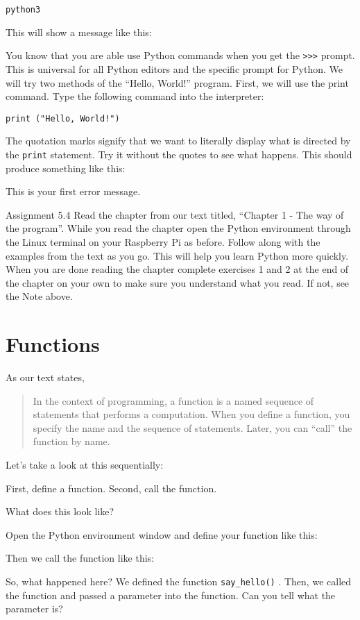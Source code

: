 \documentclass[
]{book}
\begin{document}
\texttt{python3}

This will show a message like this:

You know that you are able use Python commands when you get the \texttt{\textgreater{}\textgreater{}\textgreater{}} prompt. This is universal for all Python editors and the specific prompt for Python. We will try two methods of the ``Hello, World!'' program. First, we will use the print command. Type the following command into the interpreter:

\texttt{print\ ("Hello,\ World!")}

The quotation marks signify that we want to literally display what is directed by the \texttt{print} statement. Try it without the quotes to see what happens. This should produce something like this:

This is your first error message.

Assignment 5.4
Read the chapter from our text titled, ``Chapter 1 - The way of the program''. While you read the chapter open the Python environment through the Linux terminal on your Raspberry Pi as before. Follow along with the examples from the text as you go. This will help you learn Python more quickly. When you are done reading the chapter complete exercises 1 and 2 at the end of the chapter on your own to make sure you understand what you read. If not, see the Note above.

\hypertarget{functions}{%
\section{Functions}\label{functions}}

As our text states,

\begin{quote}
In the context of programming, a function is a named sequence of statements that performs a computation. When you define a function, you specify the name and the sequence of statements. Later, you can ``call'' the function by name.
\end{quote}

Let's take a look at this sequentially:

First, define a function. Second, call the function.

What does this look like?

Open the Python environment window and define your function like this:

Then we call the function like this:

So, what happened here? We defined the function \texttt{say\_hello()} . Then, we called the function and passed a parameter into the function. Can you tell what the parameter is?
\end{document}
